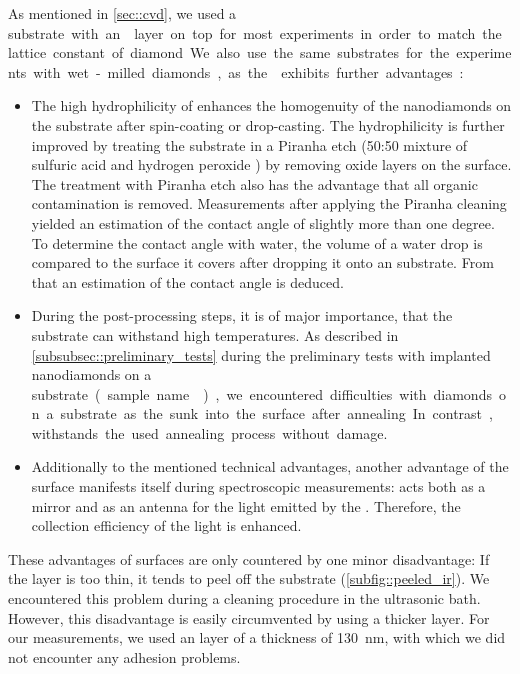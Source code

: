 	As mentioned in \autoref{sec::cvd}, we used a \si substrate with an \ir layer on top for most experiments in order to match the lattice constant of diamond.
	We also use the same substrates for the experiments with wet-milled diamonds, as the \ir exhibits further advantages:
	\begin{itemize}
		\item The high hydrophilicity of \ir {} enhances the homogenuity of the nanodiamonds on the substrate after spin-coating or drop-casting. 
		The hydrophilicity is further improved by treating the substrate in a Piranha etch (50:50 mixture of sulfuric acid  and hydrogen peroxide ) by removing oxide layers on the surface. 
		The treatment with Piranha etch also has the advantage that all organic contamination is removed.
		Measurements after applying the Piranha cleaning yielded an estimation of the contact angle of slightly more than one degree.
		To determine the contact angle with water, the volume of a water drop is compared to the surface it covers after dropping it onto an \ir substrate.
		From that an estimation of the contact angle is deduced.
		\item During the post-processing steps, it is of major importance, that the substrate can withstand high temperatures.
		As described in \autoref{subsubsec::preliminary_tests} during the preliminary tests with implanted nanodiamonds on a \si substrate (sample name ), we encountered difficulties with diamonds on a \si substrate as the sunk into the surface after annealing.
		In contrast, \ir withstands the used annealing process without damage.
		\item Additionally to the mentioned technical advantages, another advantage of the \ir surface manifests itself during spectroscopic measurements: 
{}		\Ir acts both as a mirror and as an antenna for the \fl light emitted by the \siv \cite{Neu2012a}.
		Therefore, the collection efficiency of the \fl light is enhanced.
	\end{itemize}
	These advantages of \ir surfaces are only countered by one minor disadvantage:
	If the \ir layer is too thin, it tends to peel off the substrate (\autoref{subfig::peeled_ir}).
	We encountered this problem during a cleaning procedure in the ultrasonic bath.
	However, this disadvantage is easily circumvented by using a thicker \ir layer.
	For our measurements, we used an \ir layer of a thickness of \SI{130}{nm}, with which we did not encounter any adhesion problems.

